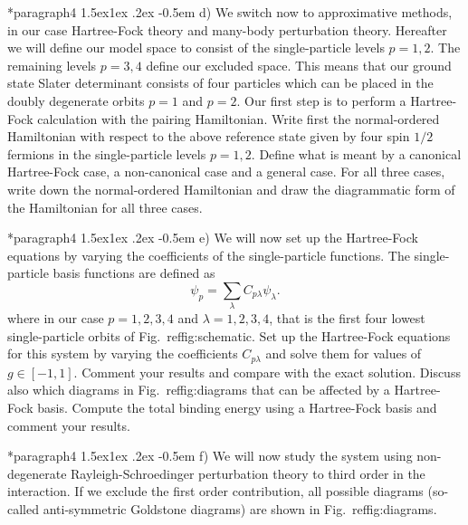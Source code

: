 \documentclass[%
twoside,                 %
final,                   %
10pt]{article}
\makeatletter
\newenvironment{doconceexercise}{}{}
\newcommand\subex{\@startsection*{paragraph}{4}{\z@}%
                  {1.5ex\@plus1ex \@minus.2ex}%
                  {-0.5em}%
                  {\normalfont\normalsize\bfseries}}
\makeatother
\begin{document}
\begin{doconceexercise}
\subex{d)}
We switch now to approximative methods, in our case Hartree-Fock
  theory and many-body perturbation theory. Hereafter we will define
  our model space to consist of the single-particle levels $p=1,2$.
  The remaining levels $p=3,4$ define our excluded space.  This means
  that our ground state Slater determinant consists of four particles
  which can be placed in the doubly degenerate orbits $p=1$ and $p=2$.
  Our first step is to perform a Hartree-Fock calculation with the
  pairing Hamiltonian.  Write first the normal-ordered Hamiltonian
  with respect to the above reference state given by four spin $1/2$
  fermions in the single-particle levels $p=1,2$. Define what is meant
  by a canonical Hartree-Fock case, a non-canonical case and a general
  case.  For all three cases, write down the normal-ordered
  Hamiltonian and draw the diagrammatic form of the Hamiltonian for all three cases.



\subex{e)}
We will now set up the Hartree-Fock equations by varying the
coefficients of the single-particle functions. The single-particle
basis functions are defined as
\[
\psi_p = \sum_{\lambda} C_{p\lambda}\psi_{\lambda}.
\]
where in our case $p=1,2,3,4$ and $\lambda=1,2,3,4$, that is the first
four lowest single-particle orbits of Fig.~ref{fig:schematic}.  Set
up the Hartree-Fock equations for this system by varying the
coefficients $C_{p\lambda}$ and solve them for values of $g\in
[-1,1]$.  Comment your results and compare with the exact
solution. Discuss also which diagrams in Fig.~ref{fig:diagrams} that
can be affected by a Hartree-Fock basis. Compute the total binding
energy using a Hartree-Fock basis and comment your results.



\subex{f)}
We will now study the system using non-degenerate
Rayleigh-Schroedinger perturbation theory to third order in the
interaction.  If we exclude the first order contribution, all possible
diagrams (so-called anti-symmetric Goldstone diagrams) are
shown in Fig.~ref{fig:diagrams}.



\end{doconceexercise}
\end{document}
